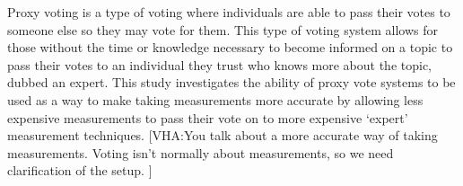 %
%
%

\begin{publicabstract}

Proxy voting is a type of voting where individuals are able to pass their votes to
someone else so they may vote for them.
This type of voting system allows for those without the time or knowledge necessary
to become informed on a topic to pass their votes to an individual they trust who
knows more about the topic, dubbed an expert.
This study investigates the ability of proxy vote systems to be used as a way to make
taking measurements more accurate by allowing less expensive measurements to pass their
vote on to more expensive `expert' measurement techniques.
[VHA:You talk about a more accurate way of taking measurements.  Voting isn’t normally about measurements, so we need clarification of the setup. ]


\end{publicabstract}



